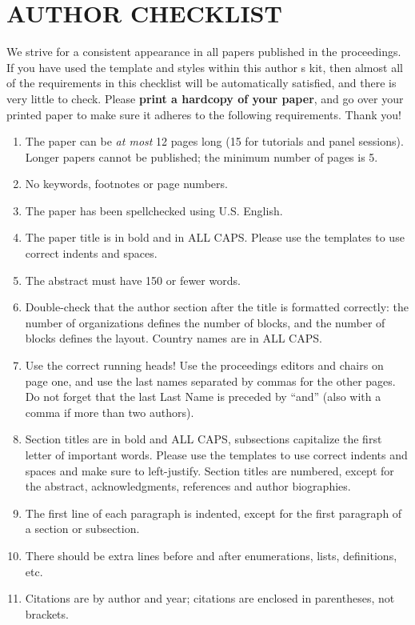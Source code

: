 \documentclass{article}
\begin{document}
\section{AUTHOR CHECKLIST}

We strive for a consistent appearance in all papers published in the proceedings. If you have used the template and styles within this author s kit, then almost all of the requirements in this checklist will be automatically satisfied, and there is very little to check. Please {\bf print a hardcopy of your paper}, and go over your printed paper to make sure it adheres to the following requirements. Thank you!

\begin{enumerate}
\item The paper can be \textit{at most} 12 pages long (15 for tutorials and panel sessions). Longer papers cannot be published; the minimum number of pages is 5.
\item No keywords, footnotes or page numbers.
\item The paper has been spellchecked using U.S. English.
\item	The paper title is in bold and in ALL CAPS. Please use the templates to use correct indents and spaces.
\item The abstract must have 150 or fewer words.
\item	Double-check that the author section after the title is formatted correctly: the number of organizations defines the number of blocks, and the number of blocks defines the layout. Country names are in ALL CAPS.
\item	Use the correct running heads! Use the proceedings editors and chairs on page one, and use the last names separated by commas for the other pages. Do not forget that the last Last Name is preceded by ``and'' (also with a comma if more than two authors). 
\item Section titles are in bold and ALL CAPS, subsections capitalize the first letter of important words. Please use the templates to use correct indents and spaces and make sure to left-justify. Section titles are numbered, except for the abstract, acknowledgments, references and author biographies.
\item The first line of each paragraph is indented, except for the first paragraph of a section or subsection.
\item There should be extra lines before and after enumerations, lists, definitions, etc.
\item Citations are by author and year; citations are enclosed in parentheses, not brackets.

\end{enumerate}
\end{document}
